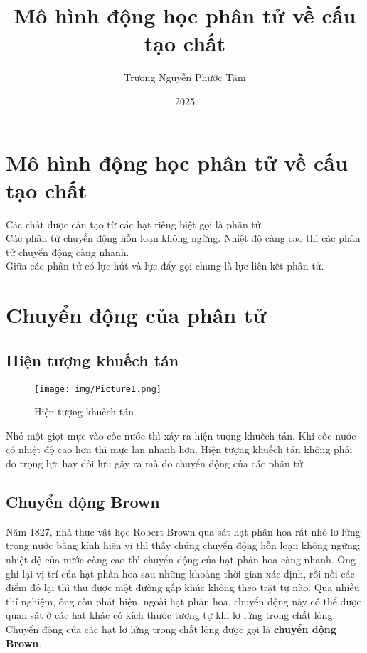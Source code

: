 \documentclass[a4paper, 12pt]{article}
\title{Mô hình động học phân tử về cấu tạo chất}
\author{Trương Nguyễn Phước Tâm}
\date{2025}
\begin{document}
	
\maketitle

\section{Mô hình động học phân tử về cấu tạo chất}

\raisebox{0.3ex}{\tiny$\bullet$} Các chất được cấu tạo từ các hạt riêng biệt gọi là phân tử.\\
\noindent
\raisebox{0.3ex}{\tiny$\bullet$} Các phân tử chuyển động hỗn loạn không ngừng. Nhiệt độ càng cao thì các phân tử chuyển động càng nhanh.\\
\noindent
\raisebox{0.3ex}{\tiny$\bullet$} Giữa các phân tử có lực hút và lực đẩy gọi chung là lực liên kết phân tử.


\section{Chuyển động của phân tử}
\subsection{Hiện tượng khuếch tán}

\begin{figure}[H]
	\centering
	\texttt{[image: img/Picture1.png]}
	\caption{Hiện tượng khuếch tán}
\end{figure}

Nhỏ một giọt mực vào cốc nước thì xảy ra hiện tượng khuếch tán. Khi cốc nước có nhiệt độ cao hơn thì mực lan nhanh hơn. Hiện tượng khuếch tán không phải do trọng lực hay đối lưu gây ra mà do chuyển động của các phân tử.


\subsection{Chuyển động Brown}

Năm 1827, nhà thực vật học Robert Brown qua sát hạt phân hoa rất nhỏ lơ lửng trong nước bằng kính hiển vi thì thấy chúng chuyển động hỗn loạn không ngừng; nhiệt độ của nước càng cao thì chuyển động của hạt phấn hoa càng nhanh. Ông ghi lại vị trí của hạt phấn hoa sau những khoảng thời gian xác định, rồi nối các điểm đó lại thì thu được một đường gấp khúc không theo trật tự nào. Qua nhiều thí nghiệm, ông còn phát hiện, ngoài hạt phấn hoa, chuyển động này có thể được quan sát ở các hạt khác có kích thước tương tự khi lơ lửng trong chất lỏng. Chuyển động của các hạt lơ lửng trong chất lỏng được gọi là \textbf{chuyển động Brown}.
\end{document}
